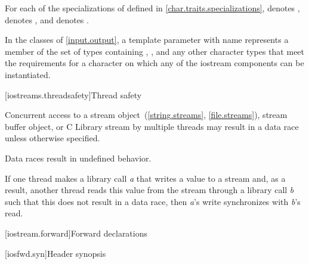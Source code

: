 \pnum
\begin{note}
For each of the specializations of  defined in
\ref{char.traits.specializations},
 denotes ,
 denotes ,
and  denotes .
\end{note}

\pnum
In the classes of \ref{input.output}, a template parameter with name
 represents a member of the set of types containing , ,
and any other 
character types that meet the requirements for a character on which any of
the iostream components can be instantiated.

[iostreams.threadsafety]{Thread safety}

\pnum
Concurrent access to a stream object~(\ref{string.streams}, \ref{file.streams}), stream buffer
object, or C Library stream by multiple threads may result in
a data race unless otherwise specified.
\begin{note}
Data races result in undefined behavior.
\end{note}

\pnum
If one thread makes a library call \textit{a} that writes a value to a stream
and, as a result, another thread reads this value from the stream through a
library call \textit{b} such that this does not result in a data race, then
\textit{a}'s write synchronizes with
\textit{b}'s read.

[iostream.forward]{Forward declarations}

[iosfwd.syn]{Header  synopsis}


